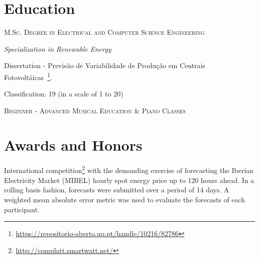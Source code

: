 \documentclass{mycv}
\begin{document}

\section{Education}{

\textsc{M.Sc. Degree in Electrical and Computer Science Engineering}

\textit{Specialization in Renewable Energy}

\begin{myitemize}
	\item Dissertation - Previs\~{a}o de Variabilidade de Produ\c{c}\~{a}o em Centrais Fotovolt\'{a}icas~\footnote{\url{https://repositorio-aberto.up.pt/handle/10216/82786}}.
	\begin{myitemize}
		\item Classification: 19 (in a scale of 1 to 20)
	\end{myitemize}
\end{myitemize}



\textsc{Beginner - Advanced Musical Education \& Piano Classes }





\section{Awards and Honors}



International competition\footnote{\url{http://complatt.smartwatt.net/}} with the demanding exercise of forecasting the Iberian Electricity Market (MIBEL) hourly spot energy price up to 120 hours ahead. In a rolling basis fashion, forecasts were submitted over a period of 14 days. A weighted mean absolute error metric was used to evaluate the forecasts of each participant.

}
\end{document}
